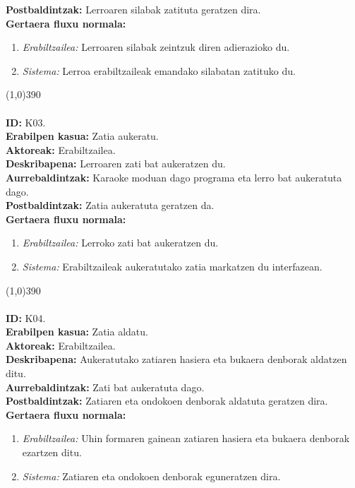 \textbf{Postbaldintzak:} Lerroaren silabak zatituta geratzen dira.\\
\textbf{Gertaera fluxu normala:}
\begin{enumerate}
	\item \textit{Erabiltzailea:} Lerroaren silabak zeintzuk diren adierazioko du.
	\item \textit{Sistema:} Lerroa erabiltzaileak emandako silabatan zatituko du.
\end{enumerate}
\line(1,0){390}\\
\noindent\\
\textbf{ID:} K03.\\
\textbf{Erabilpen kasua:} Zatia aukeratu.\\
\textbf{Aktoreak:} Erabiltzailea.\\
\textbf{Deskribapena:} Lerroaren zati bat aukeratzen du.\\
\textbf{Aurrebaldintzak:} Karaoke moduan dago programa eta lerro bat aukeratuta dago.\\
\textbf{Postbaldintzak:} Zatia aukeratuta geratzen da.\\
\textbf{Gertaera fluxu normala:}
\begin{enumerate}
	\item \textit{Erabiltzailea:} Lerroko zati bat aukeratzen du.
	\item \textit{Sistema:} Erabiltzaileak aukeratutako zatia markatzen du interfazean.
\end{enumerate}
\line(1,0){390}\\
\noindent\\
\textbf{ID:} K04.\\
\textbf{Erabilpen kasua:} Zatia aldatu.\\
\textbf{Aktoreak:} Erabiltzailea.\\
\textbf{Deskribapena:} Aukeratutako zatiaren hasiera eta bukaera denborak aldatzen ditu.\\
\textbf{Aurrebaldintzak:} Zati bat aukeratuta dago.\\
\textbf{Postbaldintzak:} Zatiaren eta ondokoen denborak aldatuta geratzen dira.\\
\textbf{Gertaera fluxu normala:}
\begin{enumerate}
	\item \textit{Erabiltzailea:} Uhin formaren gainean zatiaren hasiera eta bukaera denborak ezartzen ditu.
	\item \textit{Sistema:} Zatiaren eta ondokoen denborak eguneratzen dira.
\end{enumerate}
